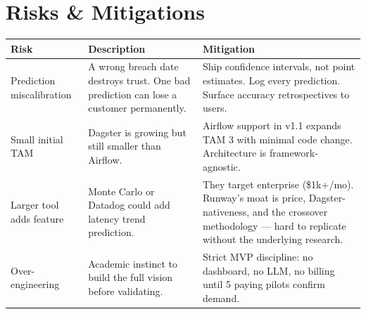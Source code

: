 
\section{Risks \& Mitigations}

\begin{center}
\small
\begin{tabularx}{0.96\textwidth}{l X X}
  \toprule
  \textbf{Risk} & \textbf{Description} & \textbf{Mitigation} \\
  \midrule
  Prediction miscalibration
    & A wrong breach date destroys trust. One bad prediction can lose a customer permanently.
    & Ship confidence intervals, not point estimates. Log every prediction.
      Surface accuracy retrospectives to users. \\[4pt]
  Small initial TAM
    & Dagster is growing but still smaller than Airflow.
    & Airflow support in v1.1 expands TAM \texttimes{}3 with minimal code change.
      Architecture is framework-agnostic. \\[4pt]
  Larger tool adds feature
    & Monte Carlo or Datadog could add latency trend prediction.
    & They target enterprise (\$1k+/mo). Runway's moat is price, Dagster-nativeness,
      and the crossover methodology — hard to replicate without the underlying research. \\[4pt]
  Over-engineering
    & Academic instinct to build the full vision before validating.
    & Strict MVP discipline: no dashboard, no LLM, no billing until 5 paying pilots confirm demand. \\
  \bottomrule
\end{tabularx}
\end{center}
